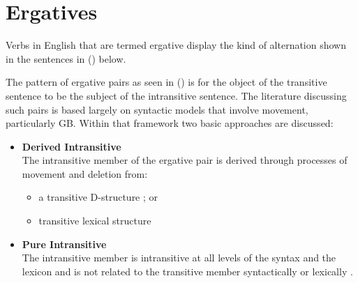 \chapter{Ergatives}
\label{ergatives}

Verbs in English that are termed ergative display the kind of
alternation shown in the sentences in () below.


The pattern of ergative pairs as seen in () is for the object of the
transitive sentence to be the subject of the intransitive sentence.
The literature discussing such pairs is based largely on syntactic
models that involve movement, particularly GB.  Within that framework
two basic approaches are discussed:

\begin{itemize}
\item {\bf Derived Intransitive}\\ The intransitive member of the
ergative pair is derived through processes of movement and deletion from:
\begin{itemize}
\item a transitive D-structure \cite{Burzio86}; or	
\item transitive lexical structure \cite{HaleKeyser86,HaleKeyser87}
\end{itemize}

\item {\bf Pure Intransitive}\\ The intransitive member is intransitive at all levels of the
syntax and the lexicon and is not related to the transitive member
syntactically or lexically \cite{Napoli88}.
\end{itemize}


